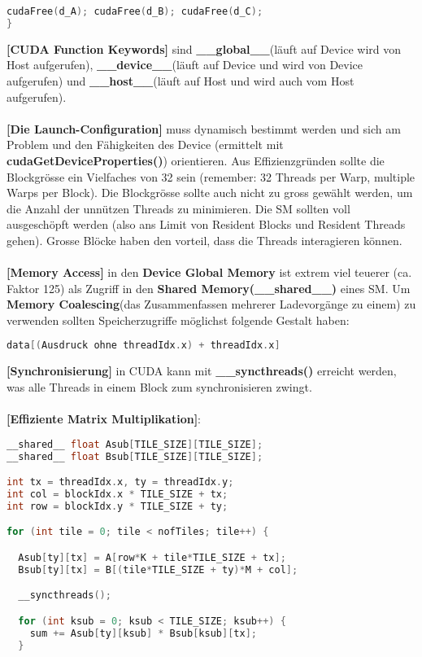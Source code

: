 \documentclass[8pt]{extarticle}
\let\oldtextbf\textbf
\renewcommand{\textbf}{\tiny\oldtextbf}
\begin{document}
\begin{multicols*}{5}
\begin{lstlisting}[language=c]
  cudaFree(d_A); cudaFree(d_B); cudaFree(d_C);
}
\end{lstlisting}
\textbf{[CUDA Function Keywords]} sind \textbf{\_\_global\_\_}(läuft auf Device wird von Host aufgerufen), \textbf{\_\_device\_\_}(läuft auf Device und wird von Device aufgerufen) und \textbf{\_\_host\_\_}(läuft auf Host und wird auch vom Host aufgerufen).\\\\
\textbf{[Die Launch-Configuration]} muss dynamisch bestimmt werden und sich am Problem und den Fähigkeiten des Device (ermittelt mit \textbf{cudaGetDeviceProperties()}) orientieren. Aus Effizienzgründen sollte die Blockgrösse ein Vielfaches von 32 sein (remember: 32 Threads per Warp, multiple Warps per Block). Die Blockgrösse sollte auch nicht zu gross gewählt werden, um die Anzahl der unnützen Threads zu minimieren. Die SM sollten voll ausgeschöpft werden (also ans Limit von Resident Blocks und Resident Threads gehen). Grosse Blöcke haben den vorteil, dass die Threads interagieren können.\\\\
\textbf{[Memory Access]} in den \textbf{Device Global Memory} ist extrem viel teuerer (ca. Faktor 125) als Zugriff in den \textbf{Shared Memory(\_\_shared\_\_)} eines SM. Um \textbf{Memory Coalescing}(das Zusammenfassen mehrerer Ladevorgänge zu einem) zu verwenden sollten Speicherzugriffe möglichst folgende Gestalt haben:
\begin{lstlisting}[language=c]
data[(Ausdruck ohne threadIdx.x) + threadIdx.x]
\end{lstlisting}
\textbf{[Synchronisierung]} in CUDA kann mit \textbf{\_\_syncthreads()} erreicht werden, was alle Threads in einem Block zum synchronisieren zwingt.\\\\
\textbf{[Effiziente Matrix Multiplikation]}:
\begin{lstlisting}[language=c]
__shared__ float Asub[TILE_SIZE][TILE_SIZE];
__shared__ float Bsub[TILE_SIZE][TILE_SIZE];

int tx = threadIdx.x, ty = threadIdx.y;
int col = blockIdx.x * TILE_SIZE + tx;
int row = blockIdx.y * TILE_SIZE + ty;

for (int tile = 0; tile < nofTiles; tile++) {

  Asub[ty][tx] = A[row*K + tile*TILE_SIZE + tx];
  Bsub[ty][tx] = B[(tile*TILE_SIZE + ty)*M + col];

  __syncthreads();

  for (int ksub = 0; ksub < TILE_SIZE; ksub++) {
    sum += Asub[ty][ksub] * Bsub[ksub][tx];
  }


\end{lstlisting}
\end{multicols*}
\end{document}
